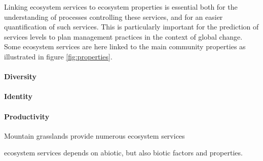 

Linking ecosystem services to ecosystem properties is essential both for the understanding of processes controlling these services, and for an easier quantification of such services. This is particularly important for the prediction of services levels to plan management practices in the context of global change. Some ecosystem services are here linked to the main community properties as illustrated in figure  \ref{fig:properties}.


\paragraph{Diversity}


\paragraph{Identity}

\paragraph{Productivity}
Mountain grasslands provide numerous ecosystem services 

ecosystem services depends on abiotic, but also biotic factors and properties. 

%

%


